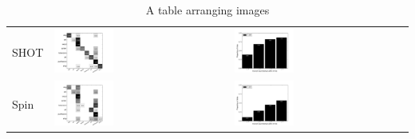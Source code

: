 \begin{table}
\begin{tabular}{m{} m{} m{}}
  SHOT & \includegraphics[width=0.35\textwidth,clip=true]{../figures/PSB/SHOT_confmat.png} & \includegraphics[width=0.35\textwidth,clip=true]{../figures/PSB/SHOT_rankhist.png} \\
  Spin & \includegraphics[width=0.35\textwidth,clip=true]{../figures/PSB/SPIN_IMAGE_confmat.png} & \includegraphics[width=0.35\textwidth,clip=true]{../figures/PSB/SPIN_IMAGE_rankhist.png} \\
\end{tabular}
\caption{A table arranging images}
\label{tab:gt}
\end{table}